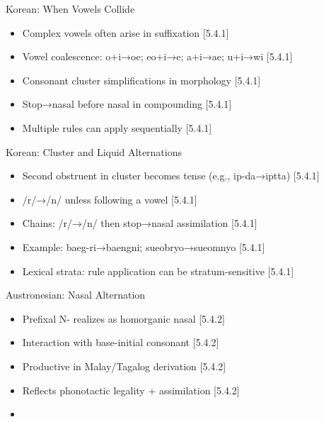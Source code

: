 \documentclass{beamer}
\newcommand{\booksrc}[1]{\hfill {\tiny [#1]}}
\begin{document}
\begin{frame}{Korean: When Vowels Collide}
\begin{itemize}
\item Complex vowels often arise in suffixation \booksrc{5.4.1}
\item Vowel coalescence: o+i→oe; eo+i→e; a+i→ae; u+i→wi \booksrc{5.4.1}
\item Consonant cluster simplifications in morphology \booksrc{5.4.1}
\item Stop→nasal before nasal in compounding \booksrc{5.4.1}
\item Multiple rules can apply sequentially \booksrc{5.4.1}
\end{itemize}
\end{frame}

\begin{frame}{Korean: Cluster and Liquid Alternations}
\begin{itemize}
\item Second obstruent in cluster becomes tense (e.g., ip-da→iptta) \booksrc{5.4.1}
\item /r/→/n/ unless following a vowel \booksrc{5.4.1}
\item Chains: /r/→/n/ then stop→nasal assimilation \booksrc{5.4.1}
\item Example: baeg-ri→baengni; sueobryo→sueomnyo \booksrc{5.4.1}
\item Lexical strata: rule application can be stratum-sensitive \booksrc{5.4.1}
\end{itemize}
\end{frame}

\begin{frame}{Austronesian: Nasal Alternation}
\begin{itemize}
\item Prefixal N- realizes as homorganic nasal \booksrc{5.4.2}
\item Interaction with base-initial consonant \booksrc{5.4.2}
\item Productive in Malay/Tagalog derivation \booksrc{5.4.2}
\item Reflects phonotactic legality + assimilation \booksrc{5.4.2}
\item %
\end{itemize}
\end{frame}
\end{document}
